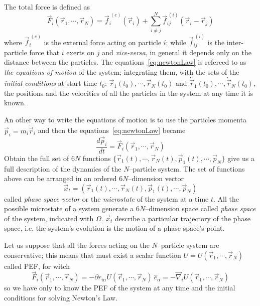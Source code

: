 The total force is defined as
\begin{equation*}
	\vec F_i(\vec r_1,\cdots,\vec r_N) = \vec{f}_i^{\ (e)}(\vec r_i) + \sum_{i\ne j}^N \vec{f}_{ij}^{\ (i)}(\vec r_i - \vec r_j )
\end{equation*}
where $\vec{f}_i^{\ (e)}$ is the external force acting on particle $i$; while $\vec{f}_{ij}^{\ (i)}$ is the inter-particle force that $i$ exerts on $j$ and \textit{vice-versa}, in general it depends only on the distance between the particles. The equations~\eqref{eq:newtonLaw} is refereed to as \textit{the equations of motion} of the system; integrating them, with the sets of the \textit{initial conditions} at start time $t_0$: $\vec r_1(t_0),\cdots,\vec r_N(t_0)$ and $\dot{\vec{r}}_1(t_0),\cdots,\dot{\vec{r}}_N(t_0)$, the positions and the velocities of all the particles in the system at any time it is known.

An other way to write the equations of motion is to use the particles momenta $\vec p_i = m_i \dot{\vec{r}}_i$ and then the equations~\eqref{eq:newtonLaw} became
\begin{equation}
	\frac{d\vec p_i}{dt} = \vec F_i(\vec r_1,\cdots,\vec r_N)
	\label{eq:newtonLawMom}
\end{equation}
Obtain the full set of $6N$ functions $\{\vec r_1(t),\cdots,\vec r_N(t),\vec p_1(t),\cdots,\vec p_N\}$ give us a full description of the dynamics of the $N$--particle system. The set of functions above can be arranged in an ordered $6N$--dimension vector
\begin{equation}
	\vec x_t = (\vec r_1(t),\cdots,\vec r_N(t),\vec p_1(t),\cdots,\vec p_N)
	\label{eq:phSpaceVector}
\end{equation}
called \textit{phase space vector} or the \textit{microstate} of the system at a time $t$. All the possible microstate of a system generate a $6N$--dimension space called \textit{phase space} of the system, indicated with $\Omega$. $\vec x_t$ describe a particular trajectory of the phase space, i.e. the system's evolution is the motion of a phase space's point.

Let us suppose that all the forces acting on the $N$--particle system are conservative; this means that must exist a scalar function $U = U(\vec r_1, \cdots, \vec r_N)$ called \ac{PEF}, for witch
\begin{equation}
	\vec F_i(\vec r_1, \cdots, \vec r_N) = -\partial r_{i\alpha}U(\vec r_1, \cdots, \vec r_N)\ \hat e_\alpha = -\vec\nabla_i U(\vec r_1, \cdots, \vec r_N)
	\label{eq:pefForces}
\end{equation}
so we have only to know the \ac{PEF} of the system at any time and the initial conditions for solving Newton's Law.

